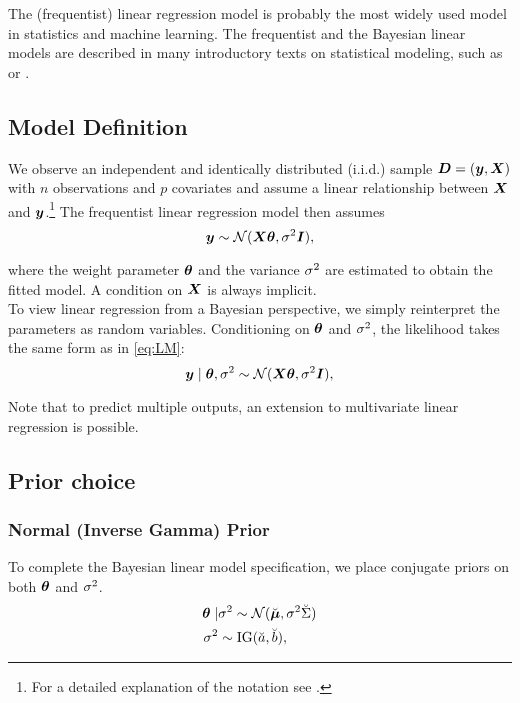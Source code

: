 The (frequentist) linear regression model is probably the most widely used model in statistics and machine learning.
The frequentist and the Bayesian linear models are described in many introductory texts on statistical modeling, such as \citet{fahrmeir_regression_2021} or \citet{gelman_bayesian_2013}.


\subsection{Model Definition}

We observe an independent and identically distributed (i.i.d.) sample $\bm{D} = (\bm{y}, \bm{X})$ with $n$ observations and $p$ covariates and assume a linear relationship between $\bm{X}$ and $\bm{y}$.\footnote{For a detailed explanation of the notation see .}
The frequentist linear regression model then assumes
\begin{equation} \label{eq:LM}
    \bm{y} \sim \mathcal{N}(\bm{X} \bm{\theta}, \sigma^2 \bm{I}),
\end{equation}

where the weight parameter $\bm{\theta}$ and the variance $\sigma^2$ are estimated to obtain the fitted model.
A condition on $\bm{X}$ is always implicit.\\

To view linear regression from a Bayesian perspective, we simply reinterpret the parameters as random variables.
Conditioning on $\bm{\theta}$ and $\sigma^2$, the likelihood takes the same form as in \autoref{eq:LM}:
\begin{equation} \label{eq:BLM}
    \bm{y} \mid \bm{\theta}, \sigma^2 \sim \mathcal{N}(\bm{X} \bm{\theta}, \sigma^2 \bm{I}), 
\end{equation}

Note that to predict multiple outputs, an extension to multivariate linear regression is possible.

\subsection{Prior choice}
\subsubsection*{Normal (Inverse Gamma) Prior}

To complete the Bayesian linear model specification, we place conjugate priors on both $\bm{\theta}$ and $\sigma^2$.
\begin{equation} \label{eq:NIGprior}
    \begin{aligned}
        \bm{\theta} \mid &\sigma^2 \sim  \mathcal{N}(\breve{\bm{\mu}}, \sigma^2 \breve{\Sigma}) \\
        \sigma^2 &\sim \text{IG}(\breve{a}, \breve{b}),
    \end{aligned}
\end{equation}


